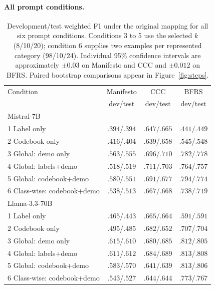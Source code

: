 \documentclass[11pt]{article}
\begin{document}
\paragraph{All prompt conditions.}

\begin{table}[!t]
\centering
\begin{tabular}{lccc}
\toprule
Condition & Manifesto & CCC & BFRS \\
 & dev/test & dev/test & dev/test \\
\midrule
\multicolumn{4}{l}{Mistral-7B} \\
1 Label only & $.394$/$.394$ & $.647$/$.665$ & $.441$/$.449$ \\
2 Codebook only & $.416$/$.404$ & $.639$/$.658$ & $.545$/$.548$ \\
3 Global: demo only & $.563$/$.555$ & $.696$/$.710$ & $.782$/$.778$ \\
4 Global: labels+demo & $.518$/$.519$ & $.711$/$.703$ & $.764$/$.757$ \\
5 Global: codebook+demo & $.580$/$.551$ & $.691$/$.677$ & $.794$/$.774$ \\
6 Class-wise: codebook+demo & $.538$/$.513$ & $.667$/$.668$ & $.738$/$.719$ \\
\midrule
\multicolumn{4}{l}{Llama-3.3-70B} \\
1 Label only & $.465$/$.443$ & $.665$/$.664$ & $.591$/$.591$ \\
2 Codebook only & $.495$/$.485$ & $.682$/$.652$ & $.707$/$.704$ \\
3 Global: demo only & $.615$/$.610$ & $.680$/$.685$ & $.812$/$.805$ \\
4 Global: labels+demo & $.611$/$.612$ & $.684$/$.689$ & $.813$/$.808$ \\
5 Global: codebook+demo & $.583$/$.570$ & $.641$/$.639$ & $.813$/$.806$ \\
6 Class-wise: codebook+demo & $.543$/$.527$ & $.644$/$.644$ & $.773$/$.767$ \\
\bottomrule
\end{tabular}
\caption{Development/test weighted F1 under the original mapping for all six prompt conditions. Conditions 3 to 5 use the selected $k$ (8/10/20); condition 6 supplies two examples per represented category (98/10/24). Individual 95\% confidence intervals are approximately $\pm0.03$ on Manifesto and CCC and $\pm0.012$ on BFRS. Paired bootstrap comparisons appear in Figure~\ref{fig:steps}.}
\label{tab:ladder}
\end{table}
\end{document}
